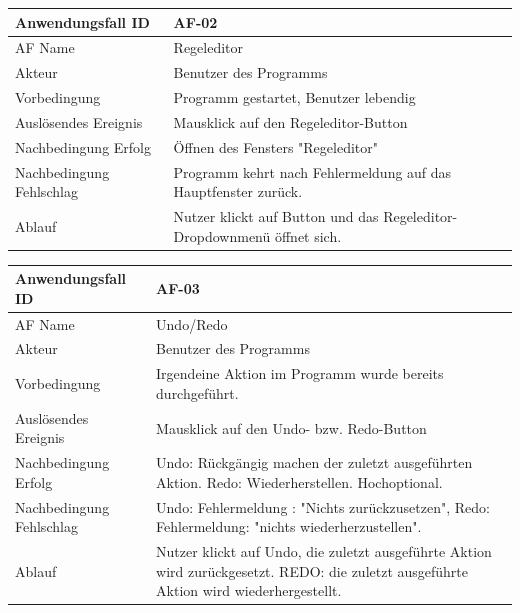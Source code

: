 \documentclass[11pt,a4paper]{article}
\begin{document}
\begin{tabular}[m]{|m{7cm}|m{9cm}|}
    \hline
    Anwendungsfall ID     & AF-02 \\
         \hline
    AF Name     &  Regeleditor \\
         \hline
    Akteur&Benutzer des Programms \\
    \hline
    Vorbedingung&Programm gestartet, Benutzer lebendig\\
    \hline
    Auslösendes Ereignis&Mausklick auf den Regeleditor-Button\\
    \hline
    Nachbedingung Erfolg&Öffnen des Fensters "Regeleditor"\\
    \hline
    Nachbedingung Fehlschlag&Programm kehrt nach Fehlermeldung auf das Hauptfenster zurück.\\
    \hline
    Ablauf&Nutzer klickt auf Button und das Regeleditor-Dropdownmenü öffnet sich.\\
    \hline
\end{tabular}
\par


\begin{tabular}[m]{|m{7cm}|m{9cm}|}
    \hline
    Anwendungsfall ID     & AF-03  \\
         \hline
    AF Name     &  Undo/Redo \\
         \hline
    Akteur&Benutzer des Programms \\
    \hline
    Vorbedingung&Irgendeine Aktion im Programm wurde bereits durchgeführt.\\
    \hline
    Auslösendes Ereignis&Mausklick auf den Undo- bzw. Redo-Button\\
    \hline
    Nachbedingung Erfolg&Undo: Rückgängig machen der zuletzt ausgeführten Aktion. Redo: Wiederherstellen. Hochoptional.\\
    \hline
    Nachbedingung Fehlschlag&Undo: Fehlermeldung : "Nichts zurückzusetzen", Redo: Fehlermeldung: "nichts wiederherzustellen".\\
    \hline
    Ablauf&Nutzer klickt auf Undo, die zuletzt ausgeführte Aktion wird zurückgesetzt. REDO: die zuletzt ausgeführte Aktion wird wiederhergestellt.\\
    \hline
\end{tabular}
\par
\end{document}
